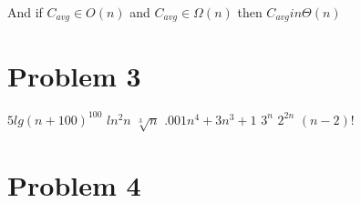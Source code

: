 \documentclass[12pt,letterpaper]{article}
\begin{document}
\begin{description}
    And if $C_{avg} \in O(n)$ and $C_{avg} \in \Omega(n)$ then $C_{avg} in \Theta(n)$ 
    
\end{description}

\section*{Problem 3}

$5lg(n+100)^{100}$ \xrightarrow{} $ln^2n$ \xrightarrow{} $\sqrt[3]{n}$ \xrightarrow{} $.001n^4+3n^3+1$ \xrightarrow{} $3^n$ \xrightarrow{} $2^{2n}$ \xrightarrow{} $(n-2)!$

\section*{Problem 4}
\end{document}
